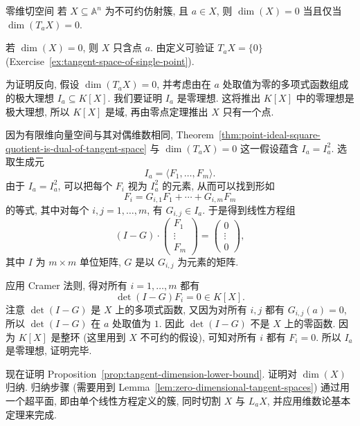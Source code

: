 \begin{Lemma}{零维切空间}\leavevmode\label{lem:zero-dimensional-tangent-spaces}
若 $X\subseteq\mathbb{A}^{n}$ 为不可约仿射簇, 且 $a\in X$, 则 $\dim(X)=0$ 当且仅当 $\dim(T_{a}X)=0$.
\end{Lemma}
\begin{Proof}
若 $\dim(X)=0$, 则 $X$ 只含点 $a$. 由定义可验证 $T_{a}X=\{0\}$ (Exercise~\ref{ex:tangent-space-of-single-point}).

为证明反向, 假设 $\dim(T_{a}X)=0$, 并考虑由在 $a$ 处取值为零的多项式函数组成的极大理想 $I_{a}\subseteq K[X]$. 我们要证明 $I_{a}$ 是零理想. 这将推出 $K[X]$ 中的零理想是极大理想, 所以 $K[X]$ 是域, 再由零点定理推出 $X$ 只有一个点.

因为有限维向量空间与其对偶维数相同, Theorem~\ref{thm:point-ideal-square-quotient-is-dual-of-tangent-space} 与 $\dim(T_{a}X)=0$ 这一假设蕴含 $I_{a}=I_{a}^{2}$. 选取生成元
\[
  I_{a}=\langle F_{1},\ldots,F_{m}\rangle.
\]
由于 $I_{a}=I_{a}^{2}$, 可以把每个 $F_{i}$ 视为 $I_{a}^{2}$ 的元素, 从而可以找到形如
\[
  F_{i}=G_{i,1}F_{1}+\cdots+G_{i,m}F_{m}
\]
的等式, 其中对每个 $i,j=1,\ldots,m$, 有 $G_{i,j}\in I_{a}$. 于是得到线性方程组
\[
  (I-G)\cdot
  \begin{pmatrix}F_{1}\\\vdots\\F_{m}\end{pmatrix}
  =\begin{pmatrix}0\\\vdots\\0\end{pmatrix},
\]
其中 $I$ 为 $m\times m$ 单位矩阵, $G$ 是以 $G_{i,j}$ 为元素的矩阵.

应用 Cramer 法则, 得对所有 $i=1,\ldots,m$ 都有
\[
  \det(I-G)F_{i}=0\in K[X].
\]
注意 $\det(I-G)$ 是 $X$ 上的多项式函数, 又因为对所有 $i,j$ 都有 $G_{i,j}(a)=0$, 所以 $\det(I-G)$ 在 $a$ 处取值为 $1$. 因此 $\det(I-G)$ 不是 $X$ 上的零函数. 因为 $K[X]$ 是整环 (这里用到 $X$ 不可约的假设), 可知对所有 $i$ 都有 $F_{i}=0$. 所以 $I_{a}$ 是零理想, 证明完毕.
\end{Proof}

现在证明 Proposition~\ref{prop:tangent-dimension-lower-bound}. 证明对 $\dim(X)$ 归纳. 归纳步骤 (需要用到 Lemma~\ref{lem:zero-dimensional-tangent-spaces}) 通过用一个超平面, 即由单个线性方程定义的簇, 同时切割 $X$ 与 $L_{a}X$, 并应用维数论基本定理来完成.

